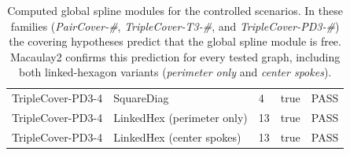 \documentclass{article}
\begin{document}
\begin{table}[ht]
\begin{tabular}{lllll}
TripleCover-PD3-4 & SquareDiag                   & 4  & true  & PASS \\
TripleCover-PD3-4 & LinkedHex (perimeter only)   & 13 & true  & PASS \\
TripleCover-PD3-4 & LinkedHex (center spokes)    & 13 & true  & PASS \\
\bottomrule
\end{tabular}
\caption{Computed global spline modules for the controlled scenarios.
In these families (\textit{PairCover-\#}, \textit{TripleCover-T3-\#}, and \textit{TripleCover-PD3-\#}) the covering hypotheses predict that the global spline module is free. Macaulay2 confirms this prediction for every tested graph, including both linked-hexagon variants (\emph{perimeter only} and \emph{center spokes}).}
\end{table}
\end{document}
